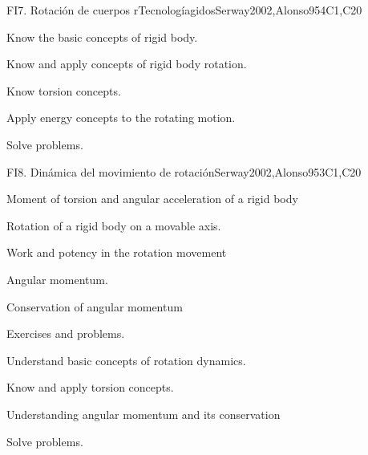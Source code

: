 \begin{syllabus}
\begin{unit}{FI7. Rotación de cuerpos rTecnologíagidos}{}{Serway2002,Alonso95}{4}{C1,C20}
   \begin{learningoutcomes}
      \item Know the basic concepts of rigid body.
      \item Know and apply concepts of rigid body rotation.
      \item Know torsion concepts.
      \item Apply energy concepts to the rotating motion.
      \item Solve problems.
   \end{learningoutcomes}
\end{unit}

\begin{unit}{FI8. Dinámica del movimiento de rotación}{}{Serway2002,Alonso95}{3}{C1,C20}
\begin{topics}
      \item Moment of torsion and angular acceleration of a rigid body
      \item Rotation of a rigid body on a movable axis.
      \item Work and potency in the rotation movement
      \item Angular momentum.
      \item Conservation of angular momentum
      \item Exercises and problems.
    \end{topics}

   \begin{learningoutcomes}
      \item Understand basic concepts of rotation dynamics.
      \item Know and apply torsion concepts.
      \item Understanding angular momentum and its conservation
      \item Solve problems.
   \end{learningoutcomes}
\end{unit}

\begin{coursebibliography}
\end{coursebibliography}
\end{syllabus}
